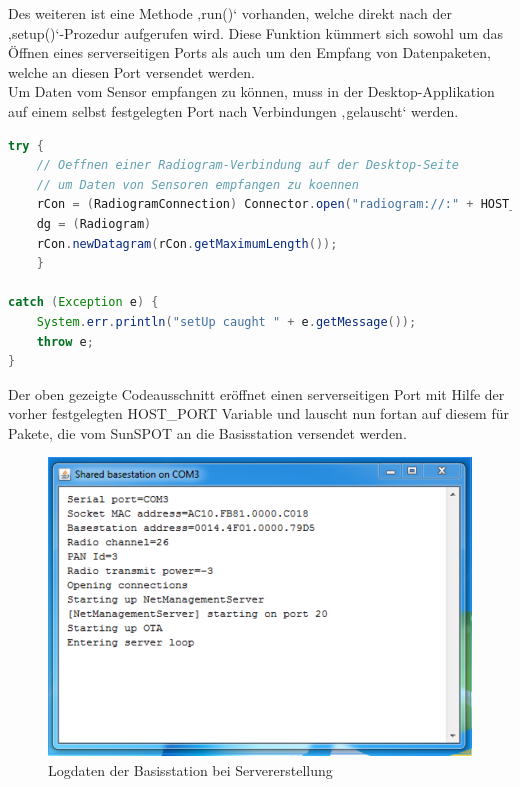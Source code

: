 Des weiteren ist eine Methode ‚run()‘ vorhanden, welche direkt nach der ‚setup()‘-Prozedur aufgerufen wird. Diese Funktion kümmert sich sowohl um das Öffnen eines serverseitigen Ports als auch um den Empfang von Datenpaketen, welche an diesen Port versendet werden. \\
Um Daten vom Sensor empfangen zu können, muss in der Desktop-Applikation auf einem selbst festgelegten Port nach Verbindungen ‚gelauscht‘ werden. 
\\
\begin{lstlisting}[language=Java,caption={Öffnen des serverseitigen Ports},label=lst:portserver,frame=single] 
try {
	// Oeffnen einer Radiogram-Verbindung auf der Desktop-Seite
	// um Daten von Sensoren empfangen zu koennen
	rCon = (RadiogramConnection) Connector.open("radiogram://:" + HOST_PORT);
	dg = (Radiogram)
	rCon.newDatagram(rCon.getMaximumLength());
	} 
	
catch (Exception e) {
	System.err.println("setUp caught " + e.getMessage());
	throw e;
}
\end{lstlisting}

Der oben gezeigte Codeausschnitt eröffnet einen serverseitigen Port mit Hilfe der vorher festgelegten HOST\_PORT Variable und lauscht nun fortan auf diesem für Pakete, die vom SunSPOT an die Basisstation versendet werden.\\

\begin{figure}[H] 
	\centering
	\includegraphics[scale=0.8]{Bilder/server}
	\caption{Logdaten der Basisstation bei Servererstellung}
	\label{f:server}
\end{figure}


